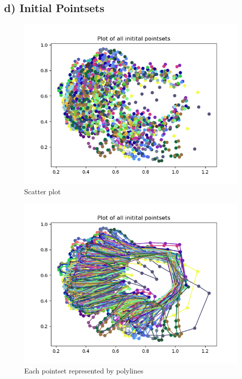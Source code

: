 \documentclass{article}
\begin{document}
\subsection{d) Initial Pointsets}
\begin{figure}[H]
    \centerline{\includegraphics[scale=0.5]{../results/hand/initial-all-data-scatter.png}}
    \caption{Scatter plot}
\end{figure}

\begin{figure}[H]
    \centerline{\includegraphics[scale=0.5]{../results/hand/initial-all-data-polyline.png}}
    \caption{Each pointset represented by polylines}
\end{figure}
\end{document}
